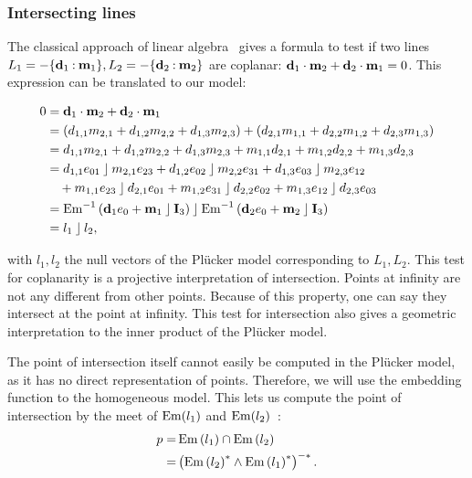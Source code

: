 \subsubsection{Intersecting lines}
The classical approach of linear algebra~\cite{Shoemake} gives a formula to test if two lines $L_1 = -\{\mathbf{d}_1 \mathbin{:} \mathbf{m}_1\}, L_2 = -\{\mathbf{d}_2 \mathbin{:} \mathbf{m}_2\}$ are coplanar: $\mathbf{d}_1 \mathbin{\cdot} \mathbf{m}_2 + \mathbf{d}_2 \mathbin{\cdot} \mathbf{m}_1 = 0$.  This expression can be translated to our model:

\begin{align}
  \label{eq:coplanar}
  0 &= \mathbf{d}_1 \mathbin{\cdot} \mathbf{m}_2 + \mathbf{d}_2 \mathbin{\cdot} \mathbf{m}_1 \nonumber \\
    &= \left( d_{1,1} m_{2,1} + d_{1,2} m_{2,2} + d_{1,3} m_{2,3} \right) + \left( d_{2,1} m_{1,1} + d_{2,2} m_{1,2} + d_{2,3} m_{1,3} \right) \nonumber \\
    &= d_{1,1} m_{2,1} + d_{1,2} m_{2,2} + d_{1,3} m_{2,3} + m_{1,1} d_{2,1} + m_{1,2} d_{2,2} + m_{1,3} d_{2,3} \nonumber \\
    &= d_{1,1} e_{01} \mathbin{\rfloor} m_{2,1} e_{23} + d_{1,2} e_{02} \mathbin{\rfloor} m_{2,2} e_{31} + d_{1,3} e_{03} \mathbin{\rfloor} m_{2,3} e_{12} \nonumber \\
    &\quad + m_{1,1} e_{23} \mathbin{\rfloor} d_{2,1} e_{01} + m_{1,2} e_{31} \mathbin{\rfloor} d_{2,2} e_{02} + m_{1,3} e_{12} \mathbin{\rfloor} d_{2,3} e_{03} \nonumber \\
    &= \operatorname{Em}^{-1}\left( \mathbf{d}_1e_0 + \mathbf{m}_1 \mathbin{\rfloor} \mathbf{I}_3 \right) \mathbin{\rfloor} \operatorname{Em}^{-1}\left( \mathbf{d}_2e_0 + \mathbf{m}_2 \mathbin{\rfloor} \mathbf{I}_3 \right) \nonumber \\
    &= l_1 \mathbin{\rfloor} l_2,
\end{align}

with $l_1, l_2$ the null vectors of the Pl\"ucker model corresponding to $L_1, L_2$.  This test for coplanarity is a projective interpretation of intersection.  Points at infinity are not any different from other points.  Because of this property, one can say they intersect at the point at infinity.  This test for intersection also gives a geometric interpretation to the inner product of the Pl\"ucker model.

The point of intersection itself cannot easily be computed in the Pl\"ucker model, as it has no direct representation of points.  Therefore, we will use the embedding function to the homogeneous model.  This lets us compute the point of intersection by the meet of $\operatorname{Em}(l_1)$ and $\operatorname{Em}(l_2)$~\cite[Section 11.7.1]{TheBook}:
\begin{align}
  \label{eq:intersect}
  p =& \operatorname{Em}\left(l_1\right) \cap \operatorname{Em}\left(l_2\right) \nonumber \\
  =& \left(\operatorname{Em}\left(l_2\right)^\ast \wedge \operatorname{Em}\left(l_1\right)^\ast\right)^{-\ast} .
\end{align}

